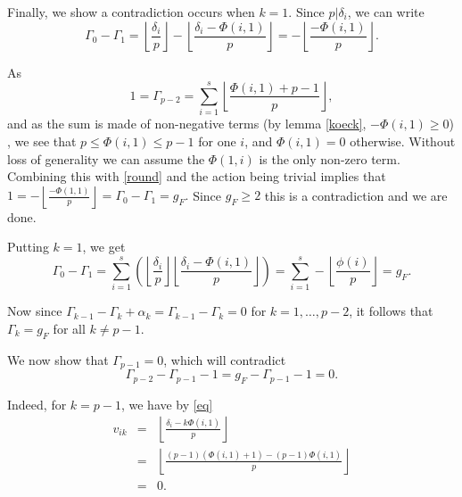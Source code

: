 Finally, we show a contradiction occurs when $k = 1$.
Since $p| \delta_i$, we can write
\begin{equation}\label{round}
 \Gamma_0 - \Gamma_1 = \left\lfloor \frac{\delta_i}{p} \right\rfloor -\left\lfloor \frac{\delta_i - \Phi(i,1)}{p} \right\rfloor = -\left\lfloor \frac{-\Phi(i,1)}{p} \right\rfloor.
\end{equation}

As 
\[
 1 = \Gamma_{p-2} = \sum_{i=1}^s\left\lfloor \frac{\Phi(i,1) + p -1}{p} \right\rfloor,
\]
 and as the sum is made of non-negative terms (by lemma \ref{koeck}, $-\Phi(i,1) \geq 0$) , we see that $p \leq \Phi(i,1) \leq p-1$ for one $i$, and $\Phi(i,1) = 0$ otherwise.
Without loss of generality we can assume the $\Phi(1,i)$ is the only non-zero term.
Combining this with \ref{round} and the action being trivial implies that $1 = -\left\lfloor \frac{-\Phi(1,1)}{p} \right\rfloor = \Gamma_0 - \Gamma_1 = g_F.$
Since $g_F \geq 2$ this is a contradiction and we are done.


\newpage


Putting $k=1$, we get 
\[
\Gamma_0 - \Gamma_1 = \sum_{i=1}^s\left(\left\lfloor \frac{\delta_i}{p} \right\rfloor \left\lfloor \frac{\delta_i - \Phi(i,1)}{p} \right\rfloor \right) = \sum_{i=1}^s - \left\lfloor \frac{\phi(i)}{p} \right\rfloor = g_F.
\]

Now since $\Gamma_{k-1}-\Gamma_k+\alpha_k = \Gamma_{k-1}-\Gamma_k = 0$ for $k=1,\ldots ,p-2$, it follows that $\Gamma_k=g_F$ for all $k\neq p-1$.

We now show that $\Gamma_{p-1} = 0$, which will contradict
\[
 \Gamma_{p-2} - \Gamma_{p-1} - 1 = g_F - \Gamma_{p-1} - 1 = 0.
\]


Indeed, for $k = p-1$, we have by \ref{eq}
\begin{eqnarray*}
v_{ik} & = & \left \lfloor \frac{\delta_i - k\Phi(i,1)}{p} \right\rfloor \\
	& = & \left\lfloor \frac{(p-1)(\Phi(i,1) + 1) - (p-1)\Phi(i,1)}{p} \right\rfloor\\
	& = & 0.
\end{eqnarray*}



